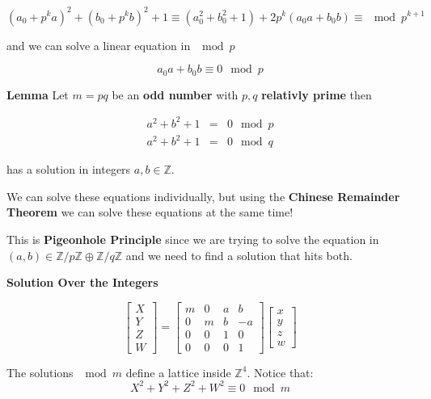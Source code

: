 \documentclass[12pt]{article}
\begin{document}
$$ (a_0 + p^ka)^2  + (b_0 + p^kb)^2 + 1 \equiv(a_0^2 + b_0^2 + 1 ) + 2p^k (a_0 a + b_0 b) \equiv \mod p^{k+1}$$

\noindent and we can solve a linear equation in $ \mod p$

$$ a_0 a + b_0 b \equiv 0 \mod p$$

\newpage

\noindent \textbf{Lemma} \newline \newline Let $m = pq$ be an \textbf{odd number} with $p,q$ \textbf{relativly prime} then

\begin{eqnarray*} 
a^2 + b^2 + 1 &=& 0 \mod p \\
a^2 + b^2 + 1 &=& 0 \mod q 
\end{eqnarray*}

\noindent has a solution in integers $a,b \in \mathbb{Z}$. \newline

\noindent We can solve these equations individually, but using the \textbf{Chinese Remainder Theorem}  we can solve these equations at the same time! \newline

\noindent This is \textbf{Pigeonhole Principle} since we are trying to solve the equation in $(a,b) \in \mathbb{Z} / p \mathbb{Z} \oplus \mathbb{Z} / q \mathbb{Z}$ and we need to find a solution that hits both.

\newpage 

\textbf{Solution Over the Integers}

$$ 
\left[\begin{array}{c} X \\ Y \\ Z \\ W \end{array} \right] = 
\left[ \begin{array}{cc|cr} m & 0 & a & b \\
0 & m & b & -a \\ \hline
0 & 0 & 1 & 0 \\
0 & 0 & 0 & 1  \end{array} \right] \left[\begin{array}{c} x \\ y \\ z \\ w \end{array} \right]$$

The solutions $\mod m$ define a lattice inside $\mathbb{Z}^4$.  Notice that:
$$ X^2 + Y^2 + Z^2 + W^2 \equiv 0 \mod m $$
\end{document}
